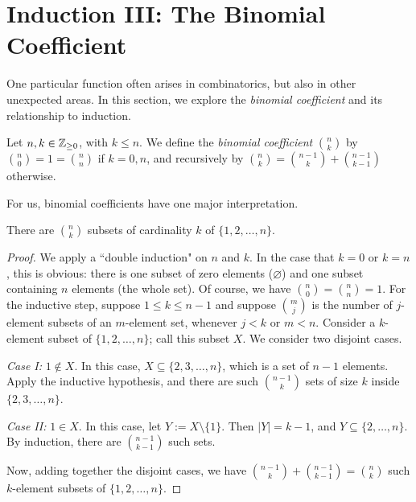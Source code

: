 \documentclass{article}
\begin{document}
\section{Induction III: The Binomial Coefficient}
One particular function often arises in combinatorics, but also in other unexpected areas. In this section, we explore the \textit{binomial coefficient} and its relationship to induction.
\begin{definition}
Let $n,k\in \mathbb Z_{\geq 0}$, with $k\leq n$. We define the \textit{binomial coefficient} $\binom nk$ by $\binom n0 = 1 = \binom nn$ if $k= 0, n$, and recursively by $\binom nk = \binom{n-1}k + \binom{n-1}{k-1}$ otherwise.
\end{definition}
\newpage
For us, binomial coefficients have one major interpretation.
\begin{proposition}
There are $\binom nk$ subsets of cardinality $k$ of $\{1, 2, \ldots, n\}$.
\end{proposition}
\begin{proof}
We apply a ``double induction" on $n$ and $k$. In the case that $k=0$ or $k=n$, this is obvious: there is one subset of zero elements ($\varnothing$) and one subset containing $n$ elements (the whole set). Of course, we have $\binom n0 = \binom nn = 1$. For the inductive step, suppose $1\leq k \leq n-1$ and suppose $\binom mj$ is the number of $j$-element subsets of an $m$-element set, whenever $j<k$ or $m<n$. Consider a $k$-element subset of $\{1, 2, \ldots, n\}$; call this subset $X$. We consider two disjoint cases.

\textit{Case I:} $1\not\in X$. In this case, $X \subseteq \{2, 3, \ldots,n\}$, which is a set of $n-1$ elements. Apply the inductive hypothesis, and there are such $\binom{n-1}k$ sets of size $k$ inside $\{2, 3, \ldots, n\}$.

\textit{Case II:} $1\in X$. In this case, let $Y := X\setminus\{1\}$. Then $|Y| = k-1$, and $Y\subseteq \{2, \ldots, n\}$. By induction, there are $\binom{n-1}{k-1}$ such sets.

Now, adding together the disjoint cases, we have $\binom {n-1}k + \binom{n-1}{k-1} = \binom nk$ such $k$-element subsets of $\{1, 2, \ldots, n\}$.
\end{proof}
\end{document}
